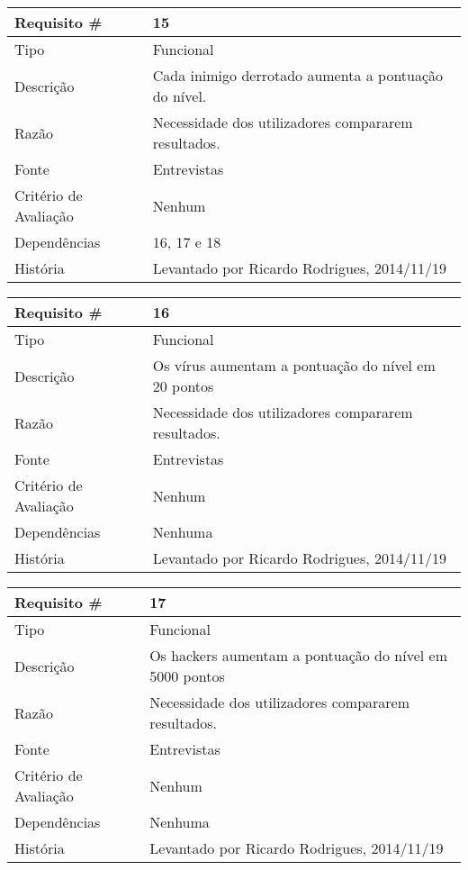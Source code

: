 \begin{tabular} {|l|p{8cm}|} 
\hline
Requisito \# & 15 \\
\hline
Tipo & Funcional \\
\hline
Descrição & Cada inimigo derrotado aumenta a pontuação do nível. \\
\hline
Razão & Necessidade dos utilizadores compararem resultados. \\
\hline
Fonte & Entrevistas \\
\hline
Critério de Avaliação & Nenhum \\
\hline
Dependências & 16, 17 e 18 \\
\hline
História & Levantado por Ricardo Rodrigues, 2014/11/19 \\
\hline
\end{tabular}

\begin{tabular} {|l|p{8cm}|} 
\hline
Requisito \# & 16 \\
\hline
Tipo & Funcional \\
\hline
Descrição & Os vírus aumentam a pontuação do nível em 20 pontos \\
\hline
Razão & Necessidade dos utilizadores compararem resultados. \\
\hline
Fonte & Entrevistas \\
\hline
Critério de Avaliação & Nenhum \\
\hline
Dependências & Nenhuma \\
\hline
História & Levantado por Ricardo Rodrigues, 2014/11/19 \\
\hline
\end{tabular}

\begin{tabular} {|l|p{8cm}|} 
\hline
Requisito \# & 17 \\
\hline
Tipo & Funcional \\
\hline
Descrição & Os hackers aumentam a pontuação do nível em 5000 pontos \\
\hline
Razão & Necessidade dos utilizadores compararem resultados. \\
\hline
Fonte & Entrevistas \\
\hline
Critério de Avaliação & Nenhum \\
\hline
Dependências & Nenhuma \\
\hline
História & Levantado por Ricardo Rodrigues, 2014/11/19 \\
\hline
\end{tabular}


